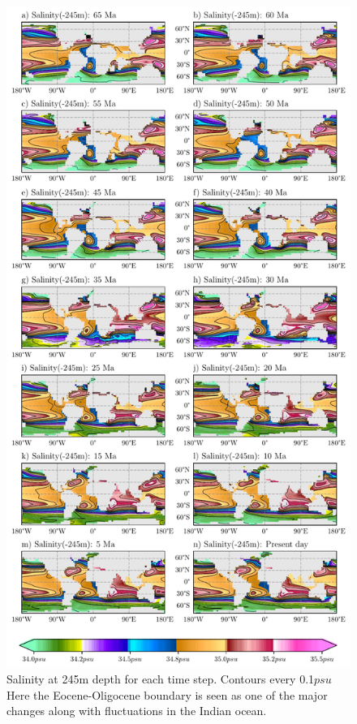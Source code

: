 \documentclass[a4paper]{article}
\begin{document}
\begin{multicols}{2}



\end{multicols}
\begin{figure}[H]
	\centering
	\includegraphics[width=0.7\linewidth]{full_sss.pdf}
	\caption{Salinity at 245m depth for each time step. Contours every 0.1$psu$ Here the Eocene-Oligocene boundary is seen as one of the major changes along with fluctuations in the Indian ocean.}
	\label{fig:sss_total}
\end{figure}
\end{document}
